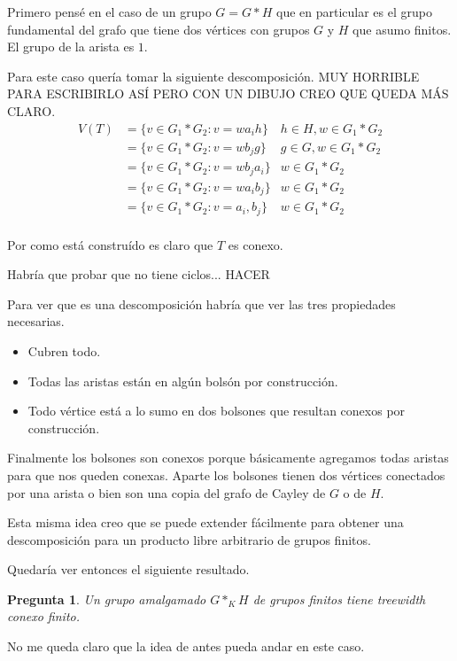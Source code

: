 \documentclass[12pt]{article}
\theoremstyle{plain} %
\newtheorem{preg}[teo]{\color{rojo} Pregunta}
\theoremstyle{definition}
\theoremstyle{remark}
\newcommand{\red}{\textcolor{rojo}}
\begin{document}
Primero pensé en el caso de un grupo $G = G \ast H$ que en particular es el grupo fundamental del grafo que tiene dos vértices con grupos $G$ y $H$ que asumo finitos. El grupo de la arista es $1$.

Para este caso quería tomar la siguiente descomposición.
\red{MUY HORRIBLE PARA ESCRIBIRLO ASÍ PERO CON UN DIBUJO CREO QUE QUEDA MÁS CLARO.}
\begin{align*}
V(T) &= \{ v \in G_1 \ast G_2 : v = wa_ih  \} & h \in H, w \in G_1 \ast G_2 \\
 & = \{ v \in G_1 \ast G_2 : v = wb_jg  \} &  g \in G, w \in G_1 \ast G_2 \\
 & = \{ v \in G_1 \ast G_2 : v = wb_ja_i  \} & w \in G_1 \ast G_2 \\
 & = \{ v \in G_1 \ast G_2 : v = wa_ib_j  \} & w \in G_1 \ast G_2 \\
 & = \{ v \in G_1 \ast G_2 : v = a_i, b_j  \} & w \in G_1 \ast G_2 \\
\end{align*}
	
Por como está construído es claro que $T$ es conexo.

Habría que probar que no tiene ciclos... 
\red{HACER}

Para ver que es una descomposición habría que ver las tres propiedades necesarias.

\begin{itemize}
	\item Cubren todo.
	\item Todas las aristas están en algún bolsón por construcción.
	\item Todo vértice está a lo sumo en dos bolsones que resultan conexos por construcción.
\end{itemize}	
	
Finalmente los bolsones son conexos porque básicamente agregamos todas aristas para que nos queden conexas. 
Aparte los bolsones tienen dos vértices conectados por una arista o bien son una copia del grafo de Cayley de $G$ o de $H$.
	
	
Esta misma idea creo que se puede extender fácilmente para obtener una descomposición para un producto libre arbitrario de grupos finitos.	
	
	
Quedaría ver entonces el siguiente resultado.

\begin{preg}
	Un grupo amalgamado $G \ast_{K} H$	de grupos finitos tiene treewidth conexo finito.
\end{preg}	
	
No me queda claro que la idea de antes pueda andar en este caso. 

	
	
	
	
	
	
	
	
	
	
	
	
	
	
	
	
	
	

	
\end{document}
